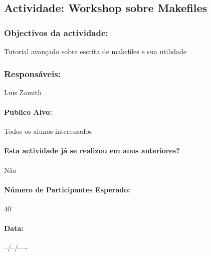 \subsection{Actividade: Workshop sobre Makefiles} %

\subsubsection*{Objectivos da actividade:}
Tutorial avançado sobre escrita de makefiles e sua utilidade

\subsubsection*{Responsáveis:}
\begin{itemizedash}
	\item{Luis Zamith}
\end{itemizedash}

\paragraph{Publico Alvo: }
Todos os alunos interessados

\paragraph{Esta actividade já se realizou em anos anteriores?}
Não

\paragraph{Número de Participantes Esperado:}
40

\paragraph{Data:} --/--/----

\vspace{20pt}
